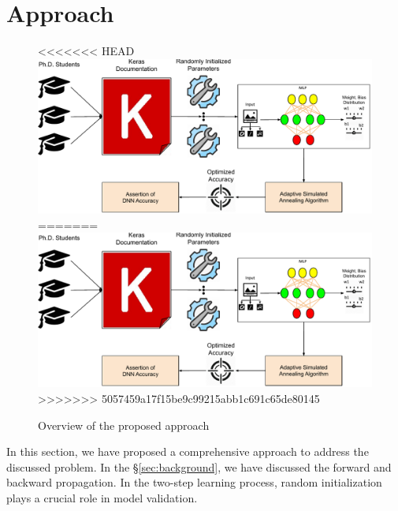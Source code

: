 \section{Approach}
\label{sec:approach}
\begin{figure}
<<<<<<< HEAD
	\includegraphics[width=0.85\linewidth]{approach}
=======
	\includegraphics[width=0.8\linewidth]{approach}
>>>>>>> 5057459a17f15be9c99215abb1c691c65de80145
	\centering
	\caption{Overview of the proposed approach}
	\label{fig:flow}
\end{figure}
In this section, we have proposed a comprehensive approach to address the discussed problem. 
In the \S\ref{sec:background}, we have discussed the forward and backward propagation. In the two-step learning process, random initialization plays a crucial role in model validation. 
